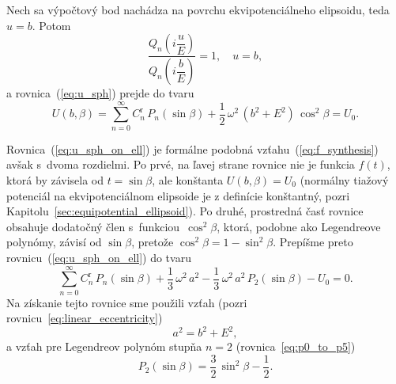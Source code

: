 \documentclass[a4paper,12pt]{book}
\begin{document}
Nech sa výpočtový bod nachádza na povrchu ekvipotenciálneho elipsoidu, teda $u 
= b$.  Potom
%
\begin{equation}
\frac{Q_n\left( i \dfrac{u}{E} \right)}{Q_n\left( i \dfrac{b}{E} \right)} 
= 1{,} \quad u = b{,}
\end{equation}
%
a rovnica~(\ref{eq:u_sph}) prejde do tvaru
%
\begin{equation}
\label{eq:u_sph_on_ell}
U(b, \beta) = \sum_{n = 0}^\infty C^{\mathrm{r}}_n \, P_n(\sin\beta) 
+ \frac{1}{2} \, \omega^2 \, (b^2 + E^2) \, \cos^2\beta = U_0{.}
\end{equation}

Rovnica~(\ref{eq:u_sph_on_ell}) je formálne podobná 
vzťahu~(\ref{eq:f_synthesis}) avšak s~dvoma rozdielmi.  Po prvé, na ľavej 
strane rovnice nie je funkcia $f(t)$, ktorá by závisela od $t = \sin\beta$, ale 
konštanta $U(b, \beta) = U_0$ (normálny tiažový potenciál na ekvipotenciálnom 
elipsoide je z definície konštantný, pozri 
Kapitolu~\ref{sec:equipotential_ellipsoid}).  Po druhé, prostredná časť rovnice 
obsahuje dodatočný člen s~funkciou~$\cos^2\beta$, ktorá, podobne ako 
Legendreove polynómy, závisí od $\sin\beta$, pretože $\cos^2\beta 
= 1 - \sin^2\beta$.  Prepíšme preto rovnicu~(\ref{eq:u_sph_on_ell}) do tvaru
%
\begin{equation}
\label{eq:cnr}
\sum_{n = 0}^\infty C^{\mathrm{r}}_n \, P_n(\sin\beta) + \frac{1}{3} \, 
\omega^2 \, a^2  - \frac{1}{3} \, \omega^2 \, a^2 \, P_2(\sin\beta) - U_0 
= 0{.}
\end{equation}
%
Na získanie tejto rovnice sme použili vzťah (pozri 
rovnicu~\ref{eq:linear_eccentricity})
%
\begin{equation}
a^2 = b^2 + E^2{,}
\end{equation}
%
a vzťah pre Legendreov polynóm stupňa $n = 2$ (rovnica~\ref{eq:p0_to_p5})
%
\begin{equation}
P_2(\sin\beta) = \frac{3}{2} \, \sin^2\beta - \frac{1}{2}{.}
\end{equation}
\end{document}
